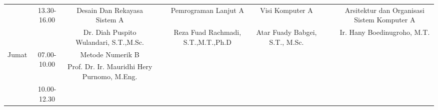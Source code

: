 \begin{table}[]
\begin{tabular}{|c|c|ccccccc|}
                          & \multirow{2}{*}{13.30-16.00} & \multicolumn{1}{c|}{Desain Dan Rekayasa   Sistem A}               & \multicolumn{1}{c|}{}                                              & \multicolumn{1}{c|}{Pemrograman Lanjut A}                     & \multicolumn{1}{c|}{Visi Komputer A}                                 & \multicolumn{1}{c|}{}                                             & \multicolumn{1}{c|}{}                                              & Arsitektur dan   Organisasi Sistem Komputer A   \\ \cline{3-9} 
                          &                              & \multicolumn{1}{c|}{Dr. Diah Puspito Wulandari, S.T.,M.Sc.}       & \multicolumn{1}{c|}{}                                              & \multicolumn{1}{c|}{Reza Fuad Rachmadi,   S.T.,M.T.,Ph.D}     & \multicolumn{1}{c|}{Atar Fuady Babgei,   S.T., M.Sc.}                & \multicolumn{1}{c|}{}                                             & \multicolumn{1}{c|}{}                                              & Ir. Hany   Boedinugroho, M.T.                   \\ \hline
  \multirow{6}{*}{Jumat}  & \multirow{2}{*}{07.00-10.00} & \multicolumn{1}{c|}{Metode Numerik B}                             & \multicolumn{1}{c|}{}                                              & \multicolumn{1}{c|}{}                                         & \multicolumn{1}{c|}{}                                                & \multicolumn{1}{c|}{}                                             & \multicolumn{1}{c|}{}                                              &                                                 \\ \cline{3-9} 
                          &                              & \multicolumn{1}{c|}{Prof. Dr. Ir. Mauridhi Hery Purnomo, M.Eng.}  & \multicolumn{1}{c|}{}                                              & \multicolumn{1}{c|}{}                                         & \multicolumn{1}{c|}{}                                                & \multicolumn{1}{c|}{}                                             & \multicolumn{1}{c|}{}                                              &                                                 \\ \cline{2-9} 
                          & \multirow{2}{*}{10.00-12.30} & \multicolumn{1}{c|}{}                                             & \multicolumn{1}{c|}{}                                              & \multicolumn{1}{c|}{}                                         & \multicolumn{1}{c|}{}                                                & \multicolumn{1}{c|}{}                                             & \multicolumn{1}{c|}{}                                              &                                                 \\ \cline{3-9} 

\end{tabular}
\end{table}
